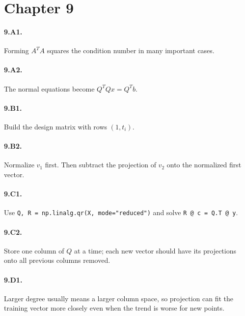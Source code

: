 \section*{Chapter 9}
\paragraph{9.A1.} Forming $A^TA$ squares the condition number in many
important cases.
\paragraph{9.A2.} The normal equations become $Q^TQx=Q^Tb$.
\paragraph{9.B1.} Build the design matrix with rows $(1,t_i)$.
\paragraph{9.B2.} Normalize $v_1$ first. Then subtract the projection of
$v_2$ onto the normalized first vector.
\paragraph{9.C1.} Use \texttt{Q, R = np.linalg.qr(X, mode="reduced")} and
solve \texttt{R @ c = Q.T @ y}.
\paragraph{9.C2.} Store one column of $Q$ at a time; each new vector should
have its projections onto all previous columns removed.
\paragraph{9.D1.} Larger degree usually means a larger column space, so
projection can fit the training vector more closely even when the trend is
worse for new points.

